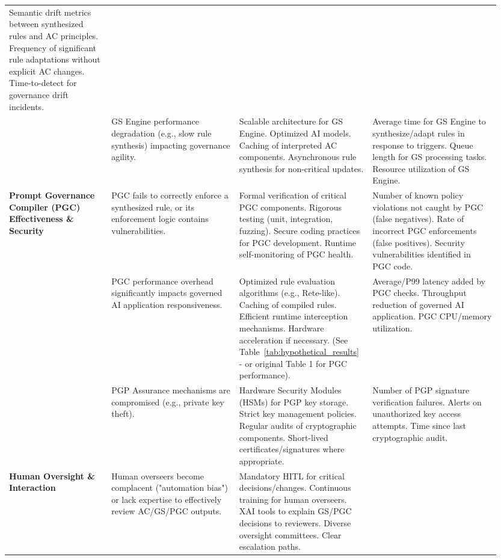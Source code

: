 \documentclass[sigconf,review,anonymous=false]{acmart} %
\begin{document}
\begin{table}[h!]
\begin{tabular}{@{}p{0.2\linewidth}p{0.25\linewidth}p{0.25\linewidth}p{0.25\linewidth}@{}}
    Semantic drift metrics between synthesized rules and AC principles. Frequency of significant rule adaptations without explicit AC changes. Time-to-detect for governance drift incidents. \\
    \addlinespace
    & GS Engine performance degradation (e.g., slow rule synthesis) impacting governance agility. &
    Scalable architecture for GS Engine. Optimized AI models. Caching of interpreted AC components. Asynchronous rule synthesis for non-critical updates. &
    Average time for GS Engine to synthesize/adapt rules in response to triggers. Queue length for GS processing tasks. Resource utilization of GS Engine. \\
    \midrule
    \textbf{Prompt Governance Compiler (PGC) Effectiveness \& Security} &
    PGC fails to correctly enforce a synthesized rule, or its enforcement logic contains vulnerabilities. &
    Formal verification of critical PGC components. Rigorous testing (unit, integration, fuzzing). Secure coding practices for PGC development. Runtime self-monitoring of PGC health. &
    Number of known policy violations not caught by PGC (false negatives). Rate of incorrect PGC enforcements (false positives). Security vulnerabilities identified in PGC code. \\
    \addlinespace
    & PGC performance overhead significantly impacts governed AI application responsiveness. &
    Optimized rule evaluation algorithms (e.g., Rete-like). Caching of compiled rules. Efficient runtime interception mechanisms. Hardware acceleration if necessary. (See Table~\ref{tab:hypothetical_results} - or original Table 1 for PGC performance). &
    Average/P99 latency added by PGC checks. Throughput reduction of governed AI application. PGC CPU/memory utilization. \\
    \addlinespace
    & PGP Assurance mechanisms are compromised (e.g., private key theft). &
    Hardware Security Modules (HSMs) for PGP key storage. Strict key management policies. Regular audits of cryptographic components. Short-lived certificates/signatures where appropriate. &
    Number of PGP signature verification failures. Alerts on unauthorized key access attempts. Time since last cryptographic audit. \\
    \midrule
    \textbf{Human Oversight \& Interaction} &
    Human overseers become complacent ("automation bias") or lack expertise to effectively review AC/GS/PGC outputs. &
    Mandatory HITL for critical decisions/changes. Continuous training for human overseers. XAI tools to explain GS/PGC decisions to reviewers. Diverse oversight committees. Clear escalation paths. &

\end{tabular}
\end{table}
\end{document}
